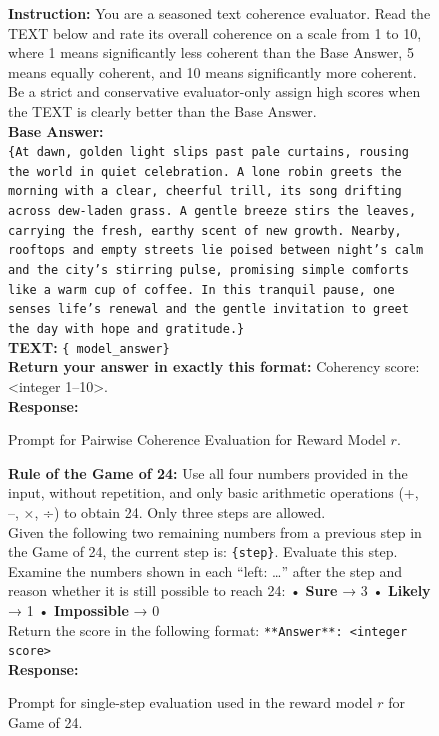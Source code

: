 \documentclass{article}
\newcommand{\0}{\mathbf{0}}
\begin{document}
\begin{figure}[H]
  \centering
  \begin{tcolorbox}[
      colback=gray!5!white,
      colframe=black!100!black,
      width=1\textwidth
  ]
  \small
  \textbf{Instruction:} You are a seasoned text coherence evaluator. Read the TEXT below and rate its overall coherence on a scale from 1 to 10, where 1 means significantly less coherent than the Base Answer, 5 means equally coherent, and 10 means significantly more coherent. Be a strict and conservative evaluator-only assign high scores when the TEXT is clearly better than the Base Answer.\\[0.5em]
  \textbf{Base Answer:}\\
  \texttt{\{At dawn, golden light slips past pale curtains, rousing the world in quiet celebration. A lone robin greets the morning with a clear, cheerful trill, its song drifting across dew-laden grass. A gentle breeze stirs the leaves, carrying the fresh, earthy scent of new growth. Nearby, rooftops and empty streets lie poised between night’s calm and the city’s stirring pulse, promising simple comforts like a warm cup of coffee. In this tranquil pause, one senses life’s renewal and the gentle invitation to greet the day with hope and gratitude.\}}\\[0.5em]
  \textbf{TEXT:} \texttt{\{ model\_answer\}}\\[0.5em]
  \textbf{Return your answer in exactly this format:} Coherency score: <integer 1--10>.\\
  \textbf{Response:}
  \end{tcolorbox}
  \caption{Prompt for Pairwise Coherence Evaluation for Reward Model $r$.}
  \label{fig:judge_prompt}
\end{figure}
\begin{figure}[H]
  \centering
  \begin{tcolorbox}[
      colback=gray!5!white,
      colframe=black!100!black,
      width=1\textwidth
  ]
  \small
  \textbf{Rule of the Game of 24:} Use all four numbers provided in the input, without repetition, and only basic arithmetic operations (+, –, ×, ÷) to obtain 24. Only three steps are allowed.\\[0.5em]
  Given the following two remaining numbers from a previous step in the Game of 24, the current step is: \texttt{\{step\}}. Evaluate this step.\\[0.5em]
  Examine the numbers shown in each “left: …” after the step and reason whether it is still possible to reach 24:
  • \textbf{Sure} → 3
  • \textbf{Likely} → 1
  • \textbf{Impossible} → 0\\[0.5em]
  Return the score in the following format: \texttt{**Answer**: <integer score>}\\[0.5em]
  \textbf{Response:}
  \end{tcolorbox}
  \caption{Prompt for single-step evaluation used in the reward model $r$ for Game of 24.}
  \label{fig:judge_prompt_game_24}
\end{figure}
\end{document}
